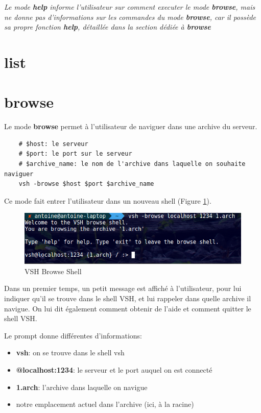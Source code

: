\documentclass[titlepage]{article}
\begin{document}
	\textit{Le mode \textbf{help} informe l'utilisateur sur comment executer le mode \textbf{browse}, mais ne donne pas d'informations sur les commandes du mode \textbf{browse}, car il possède sa propre fonction \textbf{help}, détaillée dans la section dédiée à \textbf{browse}}

	\section{list}

	\section{browse}

	Le mode \textbf{browse} permet à l'utilisateur de naviguer dans une archive du serveur.

	\begin{lstlisting}
	# $host: le serveur
	# $port: le port sur le serveur
	# $archive_name: le nom de l'archive dans laquelle on souhaite naviguer
	vsh -browse $host $port $archive_name
	\end{lstlisting}

	Ce mode fait entrer l'utilisateur dans un nouveau shell (Figure \ref{fig:browse}).

	\begin{figure}
  	\includegraphics[width=\linewidth]{browse.png}
  	\caption{VSH Browse Shell}
  	\label{fig:browse}
	\end{figure}

	Dans un premier temps, un petit message est affiché à l'utilisateur, pour lui indiquer qu'il se trouve dans le shell VSH, et lui rappeler dans quelle archive il navigue. On lui dit également comment obtenir de l'aide et comment quitter le shell VSH.

	Le prompt donne différentes d'informations:
	\begin{itemize}  
		\item \textbf{vsh}: on se trouve dans le shell vsh
		\item \textbf{@localhost:1234}: le serveur et le port auquel on est connecté
		\item \textbf{{1.arch}}: l'archive dans laquelle on navigue
		\item notre emplacement actuel dans l'archive (ici, à la racine) 
	\end{itemize}
\end{document}
